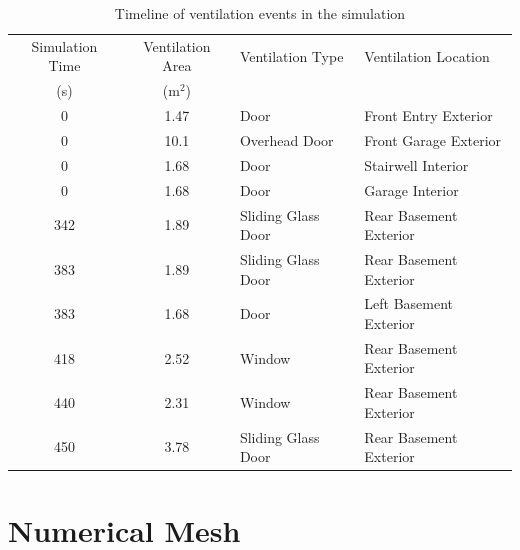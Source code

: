 \documentclass[12pt,oneside]{book}
\begin{document}
\begin{table}[!ht]
\caption[Timeline of ventilation events in the simulation]{Timeline of ventilation events in the simulation}
\begin{tabular}{ccll}
\toprule
Simulation Time      &  Ventilation Area  &  Ventilation Type    &  Ventilation Location     \\
{(s)}                &  (m$^2$)           &                      &                           \\
\midrule
0                    &  1.47              &  Door                &  Front Entry Exterior     \\
0                    &  10.1              &  Overhead Door       &  Front Garage Exterior    \\
0                    &  1.68              &  Door                &  Stairwell Interior       \\
0                    &  1.68              &  Door                &  Garage Interior          \\
342                  &  1.89              &  Sliding Glass Door  &  Rear Basement Exterior   \\
383                  &  1.89              &  Sliding Glass Door  &  Rear Basement Exterior   \\
383                  &  1.68              &  Door                &  Left Basement Exterior   \\
418                  &  2.52              &  Window              &  Rear Basement Exterior   \\
440                  &  2.31              &  Window              &  Rear Basement Exterior   \\
450                  &  3.78              &  Sliding Glass Door  &  Rear Basement Exterior   \\
\bottomrule
\end{tabular}
\label{tab:ventilation_timeline}
\end{table}

\section{Numerical Mesh}
\label{sec:numerical_mesh}
\end{document}
